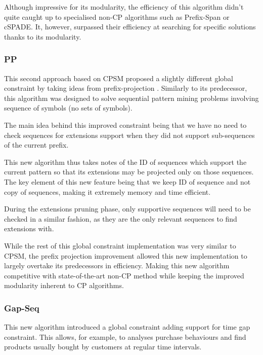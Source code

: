 \documentclass{eplmastersthesis}
\begin{document}
Although impressive for its modularity, the efficiency of this algorithm didn't quite caught up to specialised non-CP algorithms such as Prefix-Span or cSPADE. It, however, surpassed their efficiency at searching for specific solutions thanks to its modularity.

\subsubsection{PP}

This second approach based on CPSM proposed a slightly different global constraint by taking ideas from prefix-projection \cite{kemmar2015prefix}. Similarly to its predecessor, this algorithm was designed to solve sequential pattern mining problems involving sequence of symbols (no sets of symbols).\newline

The main idea behind this improved constraint being that we have no need to check sequences for extensions support when they did not support sub-sequences of the current prefix. \newline

This new algorithm thus takes notes of the ID of sequences which support the current pattern so that its extensions may be projected only on those sequences. The key element of this new feature being that we keep ID of sequence and not copy of sequences, making it extremely memory and time efficient. \newline

During the extensions pruning phase, only supportive sequences will need to be checked in a similar fashion, as they are the only relevant sequences to find extensions with. \newline

While the rest of this global constraint implementation was very similar to CPSM, the prefix projection improvement allowed this new implementation to largely overtake its predecessors in efficiency. Making this new algorithm competitive with state-of-the-art non-CP method while keeping the improved modularity inherent to CP algorithms.

\subsubsection{Gap-Seq}

This new algorithm introduced a global constraint adding support for time gap constraint. This allows, for example, to analyses purchase behaviours and find products usually bought by customers at regular time intervals. \newline
\end{document}

